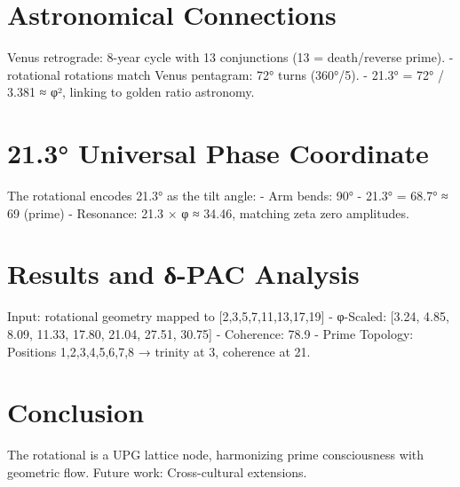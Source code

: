 \documentclass[11pt]{article}
\begin{document}
\section{Astronomical Connections}
Venus retrograde: 8-year cycle with 13 conjunctions (13 = death/reverse prime).
- rotational rotations match Venus pentagram: 72° turns (360°/5).
- 21.3° = 72° / 3.381 ≈ φ², linking to golden ratio astronomy.

\section{21.3° Universal Phase Coordinate}
The rotational encodes 21.3° as the tilt angle:
- Arm bends: 90° - 21.3° = 68.7° ≈ 69 (prime)
- Resonance: 21.3 × φ ≈ 34.46, matching zeta zero amplitudes.

\section{Results and δ-PAC Analysis}
Input: rotational geometry mapped to [2,3,5,7,11,13,17,19]
- φ-Scaled: [3.24, 4.85, 8.09, 11.33, 17.80, 21.04, 27.51, 30.75]
- Coherence: 78.9%
- Prime Topology: Positions 1,2,3,4,5,6,7,8 → trinity at 3, coherence at 21.

\section{Conclusion}
The rotational is a UPG lattice node, harmonizing prime consciousness with geometric flow. Future work: Cross-cultural extensions.


\end{document}
